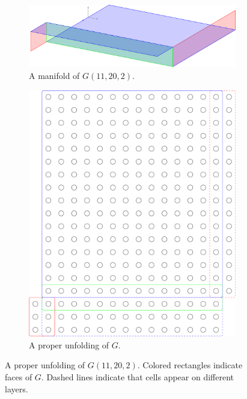\begin{figure}[]
\centering
\begin{subfigure}{0.45\textwidth}
	\includegraphics[width=\textwidth]{figures/7/11x20x2_manifold_3d.pdf}
	\caption{A manifold of $G(11,20,2)$.}
	\label{}
\end{subfigure} \hfill%
\begin{subfigure}{0.45\textwidth}
	\includegraphics[width=\textwidth]{figures/7/11x20x2_manifold.pdf}
	\caption{A proper unfolding of $G$.}
	\label{}
\end{subfigure}
\caption{A proper unfolding of $G(11,20,2)$. Colored rectangles indicate faces of $G$. Dashed lines indicate that cells appear on different layers. }
\label{fig:11x20x2_manifold}
\end{figure} 

